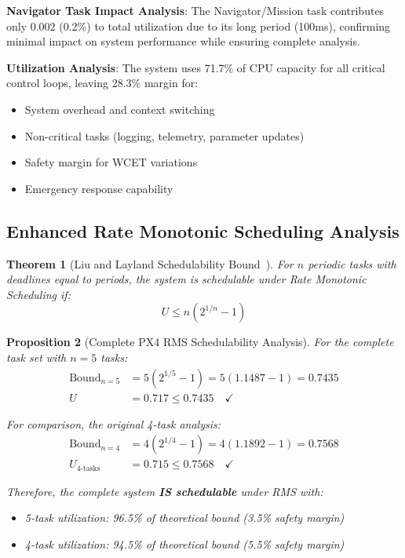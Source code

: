 \documentclass[11pt,a4paper]{article}
\newtheorem{theorem}{Theorem}[section]
\newtheorem{proposition}[theorem]{Proposition}
\theoremstyle{definition}
\theoremstyle{remark}
\begin{document}
\textbf{Navigator Task Impact Analysis}: The Navigator/Mission task contributes only 0.002 (0.2\%) to total utilization due to its long period (100ms), confirming minimal impact on system performance while ensuring complete analysis.

\textbf{Utilization Analysis}: The system uses 71.7\% of CPU capacity for all critical control loops, leaving 28.3\% margin for:
\begin{itemize}
\item System overhead and context switching
\item Non-critical tasks (logging, telemetry, parameter updates)
\item Safety margin for WCET variations
\item Emergency response capability
\end{itemize}

\subsection{Enhanced Rate Monotonic Scheduling Analysis}

\begin{theorem}[Liu and Layland Schedulability Bound~\cite{liu1973}]
For $n$ periodic tasks with deadlines equal to periods, the system is schedulable under Rate Monotonic Scheduling if:
\begin{equation}
U \leq n(2^{1/n} - 1)
\end{equation}
\end{theorem}

\begin{proposition}[Complete PX4 RMS Schedulability Analysis]
For the complete task set with $n = 5$ tasks:
\begin{align}
\text{Bound}_{n=5} &= 5(2^{1/5} - 1) = 5(1.1487 - 1) = 0.7435 \\
U &= 0.717 \leq 0.7435 \quad \checkmark
\end{align}

For comparison, the original 4-task analysis:
\begin{align}
\text{Bound}_{n=4} &= 4(2^{1/4} - 1) = 4(1.1892 - 1) = 0.7568 \\
U_{4\text{-tasks}} &= 0.715 \leq 0.7568 \quad \checkmark
\end{align}

Therefore, the complete system \textbf{IS schedulable} under RMS with:
\begin{itemize}
\item 5-task utilization: 96.5\% of theoretical bound (3.5\% safety margin)
\item 4-task utilization: 94.5\% of theoretical bound (5.5\% safety margin)
\end{itemize}
\end{proposition}
\end{document}
